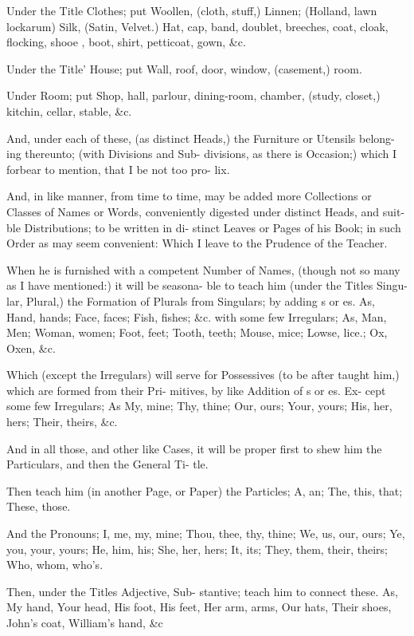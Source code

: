 Under the Title Clothes; put Woollen,
(cloth, stuff,) Linnen; (Holland, lawn
lockarum) Silk, (Satin, Velvet.) Hat,
cap, band, doublet, breeches, coat, cloak,
flocking, shooe , boot, shirt, petticoat,
gown, &c.

Under the Title' House; put Wall,
roof, door, window, (casement,) room.

Under Room; put Shop, hall, parlour,
dining-room, chamber, (study, closet,)
kitchin, cellar, stable, &c.

And, under each of these, (as distinct
Heads,) the Furniture or Utensils belong-
ing thereunto; (with Divisions and Sub-
divisions, as there is Occasion;) which I
forbear to mention, that I be not too pro-
lix.

And, in like manner, from time to
time, may be added more Collections or
Classes of Names or Words, conveniently
digested under distinct Heads, and suit-
ble Distributions; to be written in di-
stinct Leaves or Pages of his Book; in such
Order as may seem convenient: Which I
leave to the Prudence of the Teacher.

When he is furnished with a competent
Number of Names, (though not so many
as I have mentioned:) it will be seasona-
ble to teach him (under the Titles Singu-
lar, Plural,) the Formation of Plurals
from Singulars; by adding s or es. As,
Hand, hands; Face, faces; Fish, fishes;
&c. with some few Irregulars; As, Man,
Men; Woman, women; Foot, feet; Tooth,
teeth; Mouse, mice; Lowse, lice.; Ox,
Oxen, &c.

Which (except the Irregulars) will
serve for Possessives (to be after taught
him,) which are formed from their Pri-
mitives, by like Addition of s or es. Ex-
cept some few Irregulars; As My, mine;
Thy, thine; Our, ours; Your, yours; His,
her, hers; Their, theirs, &c.

And in all those, and other like Cases,
it will be proper first to shew him the
Particulars, and then the General Ti-
tle.

Then teach him (in another Page, or
Paper) the Particles; A, an; The, this,
that; These, those.

And the Pronouns; I, me, my, mine;
Thou, thee, thy, thine; We, us, our, ours;
Ye, you, your, yours; He, him, his; She,
her, hers; It, its; They, them, their,
theirs; Who, whom, who's.

Then, under the Titles Adjective, Sub-
stantive; teach him to connect these. As,
My hand, Your head, His foot, His feet,
Her arm, arms, Our hats, Their shoes,
John's coat, William's hand, &c

